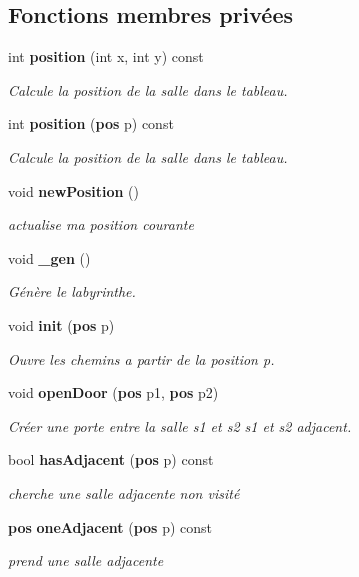 \subsection*{Fonctions membres privées}
\begin{DoxyCompactItemize}
\item 
int {\bf position} (int x, int y) const 
\begin{DoxyCompactList}\small\item\em Calcule la position de la salle dans le tableau. \end{DoxyCompactList}\item 
int {\bf position} ({\bf pos} p) const 
\begin{DoxyCompactList}\small\item\em Calcule la position de la salle dans le tableau. \end{DoxyCompactList}\item 
void {\bf new\-Position} ()
\begin{DoxyCompactList}\small\item\em actualise ma position courante \end{DoxyCompactList}\item 
void {\bf \-\_\-gen} ()
\begin{DoxyCompactList}\small\item\em Génère le labyrinthe. \end{DoxyCompactList}\item 
void {\bf init} ({\bf pos} p)
\begin{DoxyCompactList}\small\item\em Ouvre les chemins a partir de la position p. \end{DoxyCompactList}\item 
void {\bf open\-Door} ({\bf pos} p1, {\bf pos} p2)
\begin{DoxyCompactList}\small\item\em Créer une porte entre la salle s1 et s2 s1 et s2 adjacent. \end{DoxyCompactList}\item 
bool {\bf has\-Adjacent} ({\bf pos} p) const 
\begin{DoxyCompactList}\small\item\em cherche une salle adjacente non visité \end{DoxyCompactList}\item 
{\bf pos} {\bf one\-Adjacent} ({\bf pos} p) const 
\begin{DoxyCompactList}\small\item\em prend une salle adjacente \end{DoxyCompactList}\end{DoxyCompactItemize}

